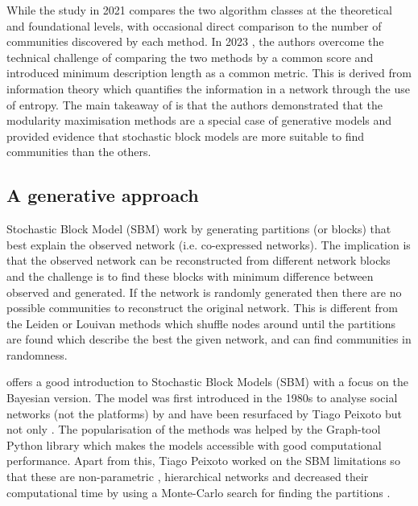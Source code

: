 While the study in 2021 \citet{Peixoto2021-jx} compares the two algorithm classes at the theoretical and foundational levels, with occasional direct comparison to the number of communities discovered by each method. In 2023 \citet{Peixoto2023-rt}, the authors overcome the technical challenge of comparing the two methods by a common score and introduced minimum description length as a common metric. This is derived from information theory which quantifies the information in a network through the use of entropy. The main takeaway of \citet{Peixoto2023-rt} is that the authors demonstrated that the modularity maximisation methods are a special case of generative models and provided evidence that stochastic block models are more suitable to find communities than the others.

\subsection{A generative approach} \label{s:lit:sbm}


Stochastic Block Model (SBM) work by generating partitions (or blocks) that best explain the observed network (i.e. co-expressed networks). The implication is that the observed network can be reconstructed from different network blocks and the challenge is to find these blocks with minimum difference between observed and generated. If the network is randomly generated then there are no possible communities to reconstruct the original network. This is different from the Leiden or Louivan methods which shuffle nodes around until the partitions are found which describe the best the given network, and can find communities in randomness. 

\citet{Peixoto2019-fg} offers a good introduction to Stochastic Block Models (SBM) with a focus on the Bayesian version. The model was first introduced in the 1980s to analyse social networks (not the platforms) by \citet{Holland1983-eu} and have been resurfaced by Tiago Peixoto \cite{Peixoto2014-ls, Peixoto2017-gc, Peixoto2018-ot} but not only \cite{Karrer2011-si}. The popularisation of the methods was helped by the Graph-tool Python library \citet{Peixoto2014-ls} which makes the models accessible with good computational performance. Apart from this, Tiago Peixoto worked on the SBM limitations so that these are non-parametric \citet{Peixoto2017-gc, Peixoto2018-ot}, hierarchical networks \citet{Peixoto2014-yb} and decreased their computational time by using a Monte-Carlo search for finding the partitions \cite{Peixoto2014-ss}.

